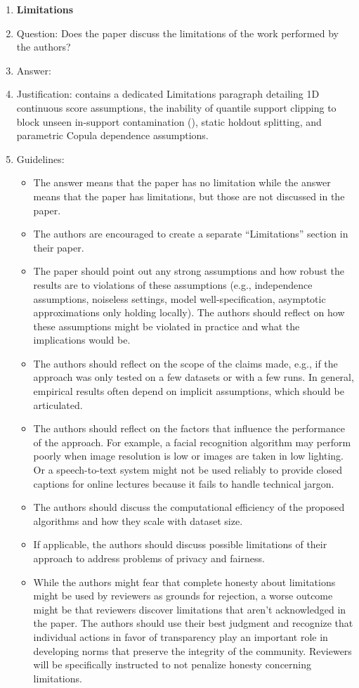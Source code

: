 \documentclass{article}
\theoremstyle{plain}
\theoremstyle{definition}
\theoremstyle{remark}
\begin{document}
\begin{enumerate}
\item {\bf Limitations}
    \item[] Question: Does the paper discuss the limitations of the work performed by the authors?
    \item[] Answer: \answerYes{}
    \item[] Justification:  contains a dedicated Limitations paragraph detailing 1D continuous score assumptions, the inability of quantile support clipping to block unseen in-support contamination (), static holdout splitting, and parametric Copula dependence assumptions.
    \item[] Guidelines:
    \begin{itemize}
        \item The answer \answerNA{} means that the paper has no limitation while the answer \answerNo{} means that the paper has limitations, but those are not discussed in the paper.
        \item The authors are encouraged to create a separate ``Limitations'' section in their paper.
        \item The paper should point out any strong assumptions and how robust the results are to violations of these assumptions (e.g., independence assumptions, noiseless settings, model well-specification, asymptotic approximations only holding locally). The authors should reflect on how these assumptions might be violated in practice and what the implications would be.
        \item The authors should reflect on the scope of the claims made, e.g., if the approach was only tested on a few datasets or with a few runs. In general, empirical results often depend on implicit assumptions, which should be articulated.
        \item The authors should reflect on the factors that influence the performance of the approach. For example, a facial recognition algorithm may perform poorly when image resolution is low or images are taken in low lighting. Or a speech-to-text system might not be used reliably to provide closed captions for online lectures because it fails to handle technical jargon.
        \item The authors should discuss the computational efficiency of the proposed algorithms and how they scale with dataset size.
        \item If applicable, the authors should discuss possible limitations of their approach to address problems of privacy and fairness.
        \item While the authors might fear that complete honesty about limitations might be used by reviewers as grounds for rejection, a worse outcome might be that reviewers discover limitations that aren't acknowledged in the paper. The authors should use their best judgment and recognize that individual actions in favor of transparency play an important role in developing norms that preserve the integrity of the community. Reviewers will be specifically instructed to not penalize honesty concerning limitations.
    \end{itemize}


\end{enumerate}
\end{document}
